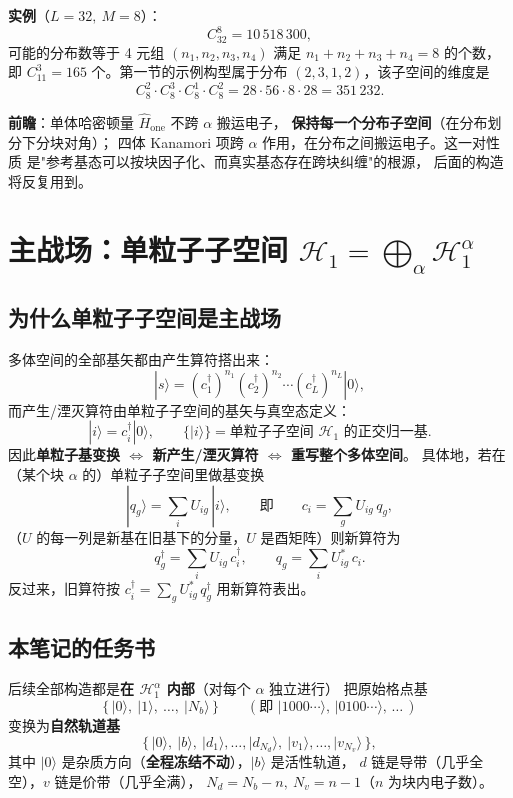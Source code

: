 \documentclass[11pt]{ctexart}
\begin{document}
\textbf{实例}（$L=32,\ M=8$）：
\[
C_{32}^{8}=10\,518\,300,
\]
可能的分布数等于 4 元组 $(n_1,n_2,n_3,n_4)$ 满足 $n_1+n_2+n_3+n_4=8$ 的个数，
即 $C_{11}^{3}=165$ 个。第一节的示例构型属于分布 $(2,3,1,2)$，该子空间的维度是
\[
C_8^2\cdot C_8^3\cdot C_8^1\cdot C_8^2
=28\cdot 56\cdot 8\cdot 28=351\,232 .
\]

\medskip
\noindent\textbf{前瞻}：单体哈密顿量 $\hat H_{\mathrm{one}}$ 不跨 $\alpha$ 搬运电子，
\textbf{保持每一个分布子空间}（在分布划分下分块对角）；
四体 Kanamori 项跨 $\alpha$ 作用，在分布之间搬运电子。这一对性质
是"参考基态可以按块因子化、而真实基态存在跨块纠缠"的根源，
后面的构造将反复用到。

\section{主战场：单粒子子空间 $\mathcal{H}_1=\bigoplus_\alpha\mathcal{H}_1^\alpha$}

\subsection{为什么单粒子子空间是主战场}

多体空间的全部基矢都由产生算符搭出来：
\[
|s\rangle=(c_1^\dagger)^{n_1}(c_2^\dagger)^{n_2}\cdots(c_L^\dagger)^{n_L}|0\rangle,
\]
而产生/湮灭算符由单粒子子空间的基矢与真空态定义：
\[
|i\rangle=c_i^\dagger|0\rangle,
\qquad
\{|i\rangle\}=\text{单粒子子空间 }\mathcal{H}_1\text{ 的正交归一基}.
\]
因此\textbf{单粒子基变换 $\Leftrightarrow$ 新产生/湮灭算符 $\Leftrightarrow$ 重写整个多体空间}。
具体地，若在（某个块 $\alpha$ 的）单粒子子空间里做基变换
\[
|q_g\rangle=\sum_i U_{ig}\,|i\rangle,
\qquad \text{即}\qquad
c_i=\sum_g U_{ig}\,q_g,
\]
（$U$ 的每一列是新基在旧基下的分量，$U$ 是酉矩阵）则新算符为
\[
q_g^\dagger=\sum_i U_{ig}\,c_i^\dagger,
\qquad
q_g=\sum_i U_{ig}^*\,c_i .
\]
反过来，旧算符按 $c_i^\dagger=\sum_g U_{ig}^*\,q_g^\dagger$ 用新算符表出。

\subsection{本笔记的任务书}

后续全部构造都是\textbf{在 $\mathcal{H}_1^\alpha$ 内部}（对每个 $\alpha$ 独立进行）
把原始格点基
\[
\big\{\,|0\rangle,\ |1\rangle,\ \dots,\ |N_b\rangle\,\big\}
\qquad(\text{即 } |1000\cdots\rangle,\,|0100\cdots\rangle,\,\dots\,)
\]
变换为\textbf{自然轨道基}
\[
\big\{\,|0\rangle,\ |b\rangle,\ |d_1\rangle,\dots,|d_{N_d}\rangle,\
|v_1\rangle,\dots,|v_{N_v}\rangle\,\big\},
\]
其中 $|0\rangle$ 是杂质方向（\textbf{全程冻结不动}），$|b\rangle$ 是活性轨道，
$d$ 链是导带（几乎全空），$v$ 链是价带（几乎全满），
$N_d=N_b-n,\ N_v=n-1$（$n$ 为块内电子数）。
\end{document}
